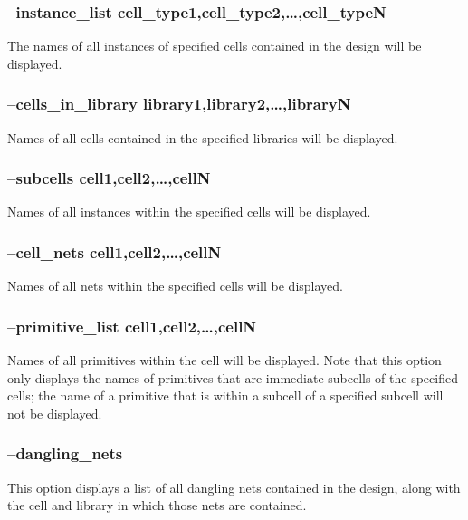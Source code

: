   \subsubsection{--instance\_list cell\_type1,cell\_type2,\ldots,cell\_typeN }
        The names of all instances of specified cells contained in the design will be displayed.

  \subsubsection{--cells\_in\_library library1,library2,\ldots,libraryN }
        Names of all cells contained in the specified libraries will be displayed.

  \subsubsection{--subcells cell1,cell2,\ldots,cellN }
        Names of all instances within the specified cells will be displayed.

  \subsubsection{--cell\_nets cell1,cell2,\ldots,cellN }
        Names of all nets within the specified cells will be displayed.

  \subsubsection{--primitive\_list cell1,cell2,\ldots,cellN }
        Names of all primitives within the cell will be displayed. Note that this option only displays the names of primitives that are immediate subcells of the specified cells; the name of a primitive that is within a subcell of a specified subcell will not be displayed.

  \subsubsection{--dangling\_nets}
        This option displays a list of all dangling nets contained in the design, along with the cell and library in which those nets are contained.



